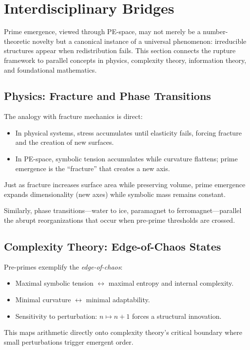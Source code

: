 \documentclass[11pt]{article}
\theoremstyle{plain}
\theoremstyle{definition}
\begin{document}
\section{Interdisciplinary Bridges}

Prime emergence, viewed through PE-space, may not merely be a number-theoretic novelty but a canonical instance of a universal phenomenon: irreducible structures appear when redistribution fails. This section connects the rupture framework to parallel concepts in physics, complexity theory, information theory, and foundational mathematics.

\subsection{Physics: Fracture and Phase Transitions}
The analogy with fracture mechanics is direct:
\begin{itemize}
  \item In physical systems, stress accumulates until elasticity fails, forcing fracture and the creation of new surfaces.  
  \item In PE-space, symbolic tension accumulates while curvature flattens; prime emergence is the “fracture” that creates a new axis.  
\end{itemize}
Just as fracture increases surface area while preserving volume, prime emergence expands dimensionality (new axes) while symbolic mass remains constant.  

Similarly, phase transitions—water to ice, paramagnet to ferromagnet—parallel the abrupt reorganizations that occur when pre-prime thresholds are crossed.

\subsection{Complexity Theory: Edge-of-Chaos States}
Pre-primes exemplify the \emph{edge-of-chaos}:
\begin{itemize}
  \item Maximal symbolic tension $\leftrightarrow$ maximal entropy and internal complexity.  
  \item Minimal curvature $\leftrightarrow$ minimal adaptability.  
  \item Sensitivity to perturbation: $n \mapsto n+1$ forces a structural innovation.  
\end{itemize}
This maps arithmetic directly onto complexity theory’s critical boundary where small perturbations trigger emergent order.
\end{document}
